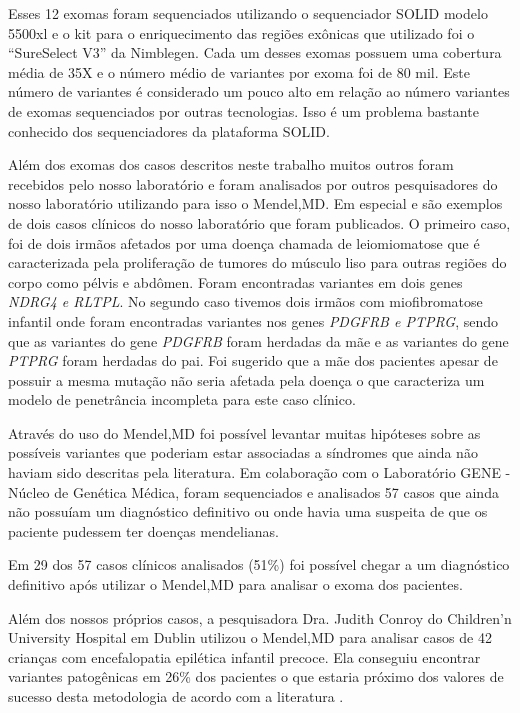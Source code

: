 Esses 12 exomas foram sequenciados utilizando o sequenciador SOLID modelo 5500xl e o kit para o enriquecimento das regiões exônicas que utilizado foi o ``SureSelect V3'' da Nimblegen. Cada um desses exomas possuem uma cobertura média de 35X e o número médio de variantes por exoma foi de 80 mil. Este número de variantes é considerado um pouco alto em relação ao número variantes de exomas sequenciados por outras tecnologias. Isso é um problema bastante conhecido dos sequenciadores da plataforma SOLID.

Além dos exomas dos casos descritos neste trabalho muitos outros foram recebidos pelo nosso laboratório e foram analisados por outros pesquisadores do nosso laboratório utilizando para isso o Mendel,MD. Em especial \cite{Linhares2014b} e \cite{Linhares2014} são exemplos de dois casos clínicos do nosso laboratório que foram publicados. O primeiro caso, foi de dois irmãos afetados por uma doença chamada de leiomiomatose que é caracterizada pela proliferação de tumores  do músculo liso para outras regiões do corpo como pélvis e abdômen. Foram encontradas variantes em dois genes \textit{NDRG4 e RLTPL}. No segundo caso tivemos dois irmãos com miofibromatose infantil onde foram encontradas variantes nos genes \textit{PDGFRB e PTPRG}, sendo que as variantes do gene \textit{PDGFRB} foram herdadas da mãe e as variantes do gene \textit{PTPRG} foram herdadas do pai. Foi sugerido que a mãe dos pacientes apesar de possuir a mesma mutação não seria afetada pela doença o que caracteriza um modelo de penetrância incompleta para este caso clínico.

Através do uso do Mendel,MD foi possível levantar muitas hipóteses sobre as possíveis variantes que poderiam estar associadas a síndromes que ainda não haviam sido descritas pela literatura. Em colaboração com o Laboratório GENE - Núcleo de Genética Médica, foram sequenciados e analisados 57 casos que ainda não possuíam um diagnóstico definitivo ou onde havia uma suspeita de que os paciente pudessem ter doenças mendelianas.

Em 29 dos 57 casos clínicos analisados (51\%) foi possível chegar a um diagnóstico definitivo após utilizar o Mendel,MD para analisar o exoma dos pacientes. 

Além dos nossos próprios casos, a pesquisadora Dra. Judith Conroy do Children'n University Hospital em Dublin utilizou o Mendel,MD para analisar casos de 42 crianças com encefalopatia epilética infantil precoce. Ela conseguiu encontrar variantes patogênicas em 26\% dos pacientes o que estaria próximo dos valores de sucesso desta metodologia de acordo com a literatura \cite{Yang2013b}.

